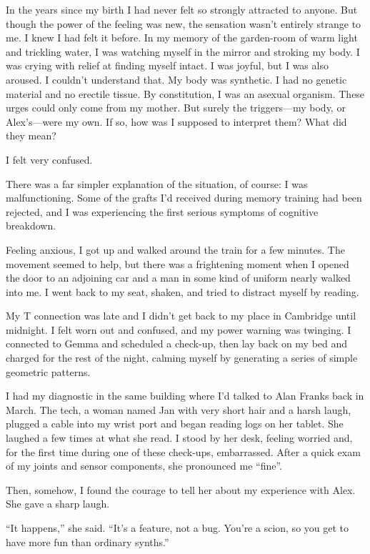 \documentclass[10pt,b5paper]{article}
\begin{document}
In the years since my birth I had never felt so strongly attracted
to anyone.  But though the power of the feeling was new, the sensation
wasn't entirely strange to me.  I knew I had felt it before.  In my
memory of the garden-room of warm light and trickling water, I was
watching myself in the mirror and stroking my body. I was crying with
relief at finding myself intact. I was joyful, but I was also aroused.
I couldn't understand that. My body was synthetic. I had no genetic
material and no erectile tissue.  By constitution, I was an asexual
organism. These urges could only come from my mother. But surely the
triggers---my body, or Alex's---were my own. If so, how was I supposed
to interpret them? What did they mean?

I felt very confused.

There was a far simpler explanation of the situation, of course:
I was malfunctioning. Some of the grafts I'd received during memory
training had been rejected, and I was experiencing the first serious
symptoms of cognitive breakdown.

Feeling anxious, I got up and walked around the train for a few
minutes.  The movement seemed to help, but there was a frightening
moment when I opened the door to an adjoining car and a man in some
kind of uniform nearly walked into me. I went back to my seat, shaken,
and tried to distract myself by reading.

My T connection was late and I didn't get back to my place in Cambridge
until midnight. I felt worn out and confused, and my power warning
was twinging. I connected to Gemma and scheduled a check-up, then lay
back on my bed and charged for the rest of the night, calming myself
by generating a series of simple geometric patterns.

\bigskip

I had my diagnostic in the same building where I'd talked to Alan
Franks back in March. The tech, a woman named Jan with very short
hair and a harsh laugh, plugged a cable into my wrist port and began
reading logs on her tablet. She laughed a few times at what she read. I
stood by her desk, feeling worried and, for the first time during one
of these check-ups, embarrassed. After a quick exam of my joints and
sensor components, she pronounced me ``fine''.

Then, somehow, I found the courage to tell her about my experience
with Alex. She gave a sharp laugh.

``It happens,'' she said. ``It's a feature, not a bug. You're a scion,
so you get to have more fun than ordinary synths.''
\end{document}
